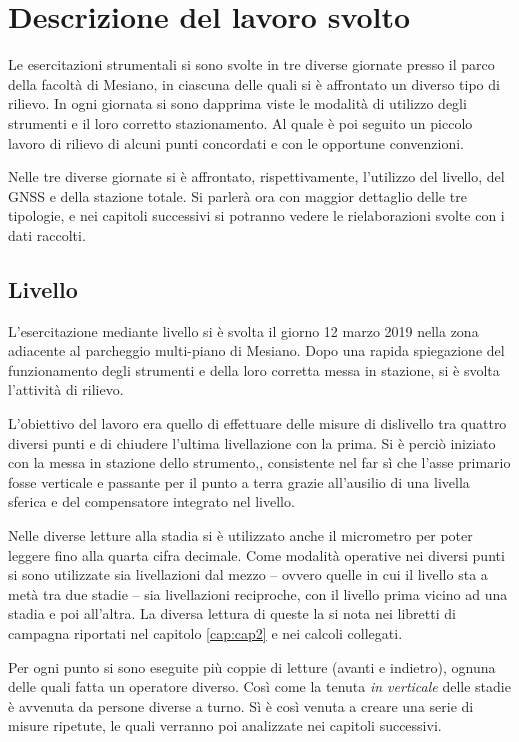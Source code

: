 \chapter{Descrizione del lavoro svolto}
\setcounter{page}{1}
Le esercitazioni strumentali si sono svolte in tre diverse giornate presso il  parco della facoltà di Mesiano, in ciascuna delle quali si è affrontato un diverso tipo di rilievo.
In ogni giornata si sono dapprima viste le modalità di utilizzo degli strumenti e il loro corretto stazionamento.
Al quale è poi seguito un piccolo lavoro di rilievo di alcuni punti concordati e con le opportune convenzioni.

Nelle tre diverse giornate si è affrontato, rispettivamente, l'utilizzo del livello, del GNSS e della stazione totale. 
Si parlerà ora con maggior dettaglio delle tre tipologie, e nei capitoli successivi si potranno vedere le rielaborazioni svolte con i dati raccolti.
\section{Livello}
L'esercitazione mediante livello si è svolta il giorno 12 marzo 2019 nella zona adiacente al parcheggio multi-piano di Mesiano.
Dopo una rapida spiegazione del funzionamento degli strumenti e della loro corretta messa in stazione, si è svolta l'attività di rilievo. 

L'obiettivo del lavoro era quello di effettuare delle misure di dislivello tra quattro diversi punti e di chiudere l'ultima livellazione con la prima. 
Si è perciò iniziato con la messa in stazione dello strumento,, consistente nel far sì che l'asse primario fosse verticale e passante per il punto a terra grazie all'ausilio di una livella sferica e del compensatore integrato nel livello.  

Nelle diverse letture alla stadia si è utilizzato anche il micrometro per poter leggere fino alla quarta cifra decimale.
Come modalità operative nei diversi punti si sono utilizzate sia livellazioni dal mezzo -- ovvero quelle in cui il livello sta a metà tra due stadie -- sia livellazioni reciproche, con il livello prima vicino ad una stadia e poi all'altra.
La diversa lettura di queste la si nota nei libretti di campagna riportati nel  capitolo \ref{cap:cap2} e nei calcoli collegati. 

Per ogni punto si sono eseguite più coppie di letture (avanti e indietro), ognuna delle quali fatta un operatore diverso. Così come la tenuta \emph{in verticale} delle stadie è avvenuta da persone diverse a turno. 
Sì è così venuta a creare una serie di misure ripetute, le quali verranno poi analizzate nei capitoli successivi.
